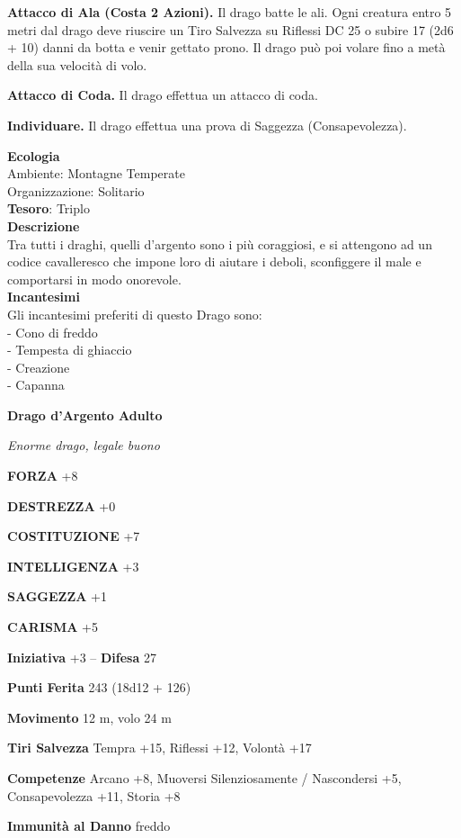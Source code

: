 \begin{multicols}{2}
\textbf{Attacco di Ala (Costa 2 Azioni).} Il drago batte le ali. Ogni creatura entro 5 metri dal drago deve riuscire un Tiro Salvezza su Riflessi DC 25 o subire 17 (2d6 + 10) danni da botta e venir gettato prono. Il drago può poi volare fino a metà della sua velocità di volo.

\textbf{Attacco di Coda.} Il drago effettua un attacco di coda.

\textbf{Individuare.} Il drago effettua una prova di Saggezza (Consapevolezza).

\textbf{Ecologia}\\
Ambiente: Montagne Temperate\\
Organizzazione: Solitario\\
\textbf{Tesoro}: Triplo\\
\textbf{Descrizione}\\
Tra tutti i draghi, quelli d'argento sono i più coraggiosi, e si attengono ad un codice cavalleresco che impone loro di aiutare i deboli, sconfiggere il male e comportarsi in modo onorevole.\\
\textbf{Incantesimi}\\
Gli incantesimi preferiti di questo Drago sono:\\
- Cono di freddo\\
- Tempesta di ghiaccio\\
- Creazione\\
- Capanna

\medskip{}\textbf{Drago d'Argento Adulto}

\textit{Enorme drago, legale buono}

\textbf{FORZA} +8

\textbf{DESTREZZA} +0

\textbf{COSTITUZIONE} +7

\textbf{INTELLIGENZA} +3

\textbf{SAGGEZZA} +1

\textbf{CARISMA} +5

\textbf{Iniziativa} +3 -- \textbf{Difesa} 27

\textbf{Punti Ferita} 243 (18d12 + 126)

\textbf{Movimento} 12 m, volo 24 m

\textbf{Tiri Salvezza} Tempra +15, Riflessi +12, Volontà +17

\textbf{Competenze} Arcano +8, Muoversi Silenziosamente / Nascondersi +5, Consapevolezza +11, Storia +8

\textbf{Immunità al Danno} freddo


\end{multicols}
